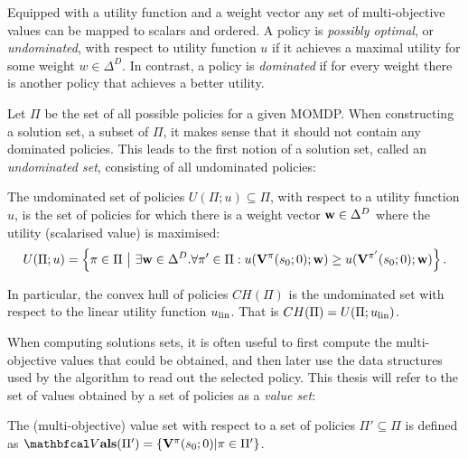     Equipped with a utility function and a weight vector any set of multi-objective values can be mapped to scalars and ordered. A policy is \textit{possibly optimal}, or \textit{undominated}, with respect to utility function $u$ if it achieves a maximal utility for some weight $w\in\Delta^D$. In contrast, a policy is \textit{dominated} if for every weight there is another policy that achieves a better utility. 
    
    Let $\Pi$ be the set of all possible policies for a given MOMDP. When constructing a solution set, a subset of $\Pi$, it makes sense that it should not contain any dominated policies. This leads to the first notion of a solution set, called an \textit{undominated set}, consisting of all undominated policies:
    \begin{defn}
        \label{def:2:undominated_set}
        \label{def:2:convex_hull}
        The \textnormal{undominated set} of policies $U(\Pi;u)\subseteq\Pi$, with respect to a utility function $u$,  is the set of policies for which there is a weight vector $\mathbf{w}\in\Delta^D$ where the utility (scalarised value) is maximised: 
        \begin{align}
            U(\Pi;u) = \left\{\pi\in\Pi\ \big|\ \exists \mathbf{w}\in\Delta^D. \forall \pi'\in\Pi: u(\mathbf{V}^{\pi}(s_0;0);\mathbf{w}) \geq u(\mathbf{V}^{\pi'}(s_0;0);\mathbf{w}) \right\}. \label{eq:2:undominated_set_def}
        \end{align}

        In particular, the \textnormal{convex hull} of policies $CH(\Pi)$ is the undominated set with respect to the linear utility function $u_{{\textnormal{lin}}}$. That is $CH(\Pi)=U(\Pi;u_{{\textnormal{lin}}})$.
    \end{defn}    

    
    When computing solutions sets, it is often useful to first compute the multi-objective values that could be obtained, and then later use the data structures used by the algorithm to read out the selected policy. This thesis will refer to the set of values obtained by a set of policies as a \textit{value set}:
    \begin{defn}
        \label{def:2:mo_value_set}
        The \textnormal{(multi-objective) value set} with respect to a set of policies $\Pi'\subseteq\Pi$ is defined as $\valset(\Pi') = \{\bff{V}^{\pi}(s_0;0) | \pi \in \Pi'\}$.
    \end{defn}

